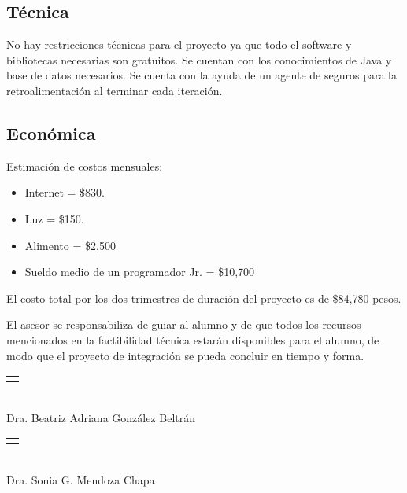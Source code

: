 \subsection*{Técnica}
No hay restricciones técnicas para el proyecto ya que todo el software y bibliotecas necesarias son gratuitos. Se cuentan con los conocimientos de Java y base de datos necesarios.
Se cuenta con la ayuda de un agente de seguros para la retroalimentación al terminar cada iteración.

\subsection*{Económica}
Estimación de costos mensuales:

\begin{itemize}
	\item Internet = \$830.
	\item Luz = \$150.
	\item Alimento = \$2,500
	\item Sueldo medio de un programador Jr. = \$10,700
\end{itemize}

El costo total por los dos trimestres de duración del proyecto es de \$84,780 pesos.

\newpage
El asesor se responsabiliza de guiar al alumno y de que todos los recursos mencionados en la factibilidad técnica estarán disponibles para el alumno, de modo que el proyecto
de integración se pueda concluir en tiempo y forma.\\[2cm]

\begin{center}
	\begin{minipage}{0.4\textwidth}
		\centering
		\begin{tabular}{l}
			\makebox[5cm]{\hrulefill}
		\end{tabular}\\
		Dra. Beatriz Adriana González Beltrán%
	\end{minipage}
	\begin{minipage}{0.4\textwidth}
		\centering
		\begin{tabular}{l}
			\makebox[5cm]{\hrulefill}
		\end{tabular}\\
		Dra. Sonia G. Mendoza Chapa%
	\end{minipage}
\end{center}


